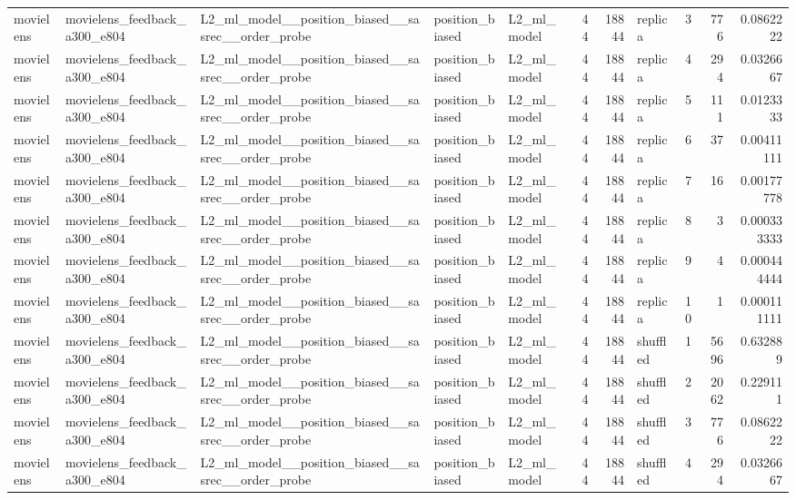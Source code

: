 \begin{table}[htbp!]
\begin{tabular}{lllllrrlrrr}
movielens & movielens\_feedback\_a300\_e804 & L2\_ml\_model\_\_position\_biased\_\_sasrec\_\_order\_probe & position\_biased & L2\_ml\_model & 44 & 18844 & replica & 3 & 776 & 0.0862222 \\
movielens & movielens\_feedback\_a300\_e804 & L2\_ml\_model\_\_position\_biased\_\_sasrec\_\_order\_probe & position\_biased & L2\_ml\_model & 44 & 18844 & replica & 4 & 294 & 0.0326667 \\
movielens & movielens\_feedback\_a300\_e804 & L2\_ml\_model\_\_position\_biased\_\_sasrec\_\_order\_probe & position\_biased & L2\_ml\_model & 44 & 18844 & replica & 5 & 111 & 0.0123333 \\
movielens & movielens\_feedback\_a300\_e804 & L2\_ml\_model\_\_position\_biased\_\_sasrec\_\_order\_probe & position\_biased & L2\_ml\_model & 44 & 18844 & replica & 6 & 37 & 0.00411111 \\
movielens & movielens\_feedback\_a300\_e804 & L2\_ml\_model\_\_position\_biased\_\_sasrec\_\_order\_probe & position\_biased & L2\_ml\_model & 44 & 18844 & replica & 7 & 16 & 0.00177778 \\
movielens & movielens\_feedback\_a300\_e804 & L2\_ml\_model\_\_position\_biased\_\_sasrec\_\_order\_probe & position\_biased & L2\_ml\_model & 44 & 18844 & replica & 8 & 3 & 0.000333333 \\
movielens & movielens\_feedback\_a300\_e804 & L2\_ml\_model\_\_position\_biased\_\_sasrec\_\_order\_probe & position\_biased & L2\_ml\_model & 44 & 18844 & replica & 9 & 4 & 0.000444444 \\
movielens & movielens\_feedback\_a300\_e804 & L2\_ml\_model\_\_position\_biased\_\_sasrec\_\_order\_probe & position\_biased & L2\_ml\_model & 44 & 18844 & replica & 10 & 1 & 0.000111111 \\
movielens & movielens\_feedback\_a300\_e804 & L2\_ml\_model\_\_position\_biased\_\_sasrec\_\_order\_probe & position\_biased & L2\_ml\_model & 44 & 18844 & shuffled & 1 & 5696 & 0.632889 \\
movielens & movielens\_feedback\_a300\_e804 & L2\_ml\_model\_\_position\_biased\_\_sasrec\_\_order\_probe & position\_biased & L2\_ml\_model & 44 & 18844 & shuffled & 2 & 2062 & 0.229111 \\
movielens & movielens\_feedback\_a300\_e804 & L2\_ml\_model\_\_position\_biased\_\_sasrec\_\_order\_probe & position\_biased & L2\_ml\_model & 44 & 18844 & shuffled & 3 & 776 & 0.0862222 \\
movielens & movielens\_feedback\_a300\_e804 & L2\_ml\_model\_\_position\_biased\_\_sasrec\_\_order\_probe & position\_biased & L2\_ml\_model & 44 & 18844 & shuffled & 4 & 294 & 0.0326667 \\

\end{tabular}
\end{table}
